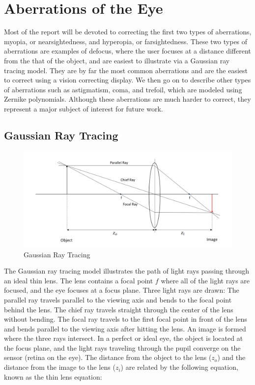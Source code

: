 \chapter{Aberrations of the Eye}

Most of the report will be devoted to correcting the first two types of aberrations, myopia, or nearsightedness, and hyperopia, or farsightedness. These two types of aberrations are examples of defocus, where the user focuses at a distance different from the that of the object, and are easiest to illustrate via a Gaussian ray tracing model. They are by far the most common aberrations and are the easiest to correct using a vision correcting display. We then go on to describe other types of aberrations such as astigmatism, coma, and trefoil, which are modeled using Zernike polynomials. Although these aberrations are much harder to correct, they represent a major subject of interest for future work.

\section{Gaussian Ray Tracing}

\begin{figure}[h!]
  \centering
  \includegraphics[width=5.0in]{chapters/chapter2/images/gauss.png}
  \caption{Gaussian Ray Tracing}
  \label{fig:gaussian}
\end{figure}

The Gaussian ray tracing model illustrates the path of light rays passing through an ideal thin lens. The lens contains a focal point $f$ where all of the light rays are focused, and the eye focuses at a focus plane. Three light rays are drawn: The parallel ray travels parallel to the viewing axis and bends to the focal point behind the lens. The chief ray travels straight through the center of the lens without bending. The focal ray travels to the first focal point in front of the lens and bends parallel to the viewing axis after hitting the lens. An image is formed where the three rays intersect. In a perfect or ideal eye, the object is located at the focus plane, and the light rays traveling through the pupil converge on the sensor (retina on the eye).  The distance from the object to the lens ($z_o$) and the distance from the image to the lens ($z_i$) are related by the following equation, known as the thin lens equation: 

